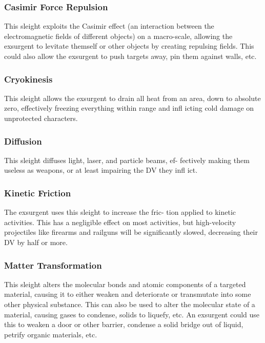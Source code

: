 \subsubsection{Casimir Force Repulsion}

This sleight exploits the Casimir effect (an interaction 
between the electromagnetic fields of different objects) 
on a macro-scale, allowing the exsurgent to levitate 
themself or other objects by creating repulsing fields. 
This could also allow the exsurgent to push targets 
away, pin them against walls, etc. 

\subsubsection{Cryokinesis}

This sleight allows the exsurgent to drain all heat from 
an area, down to absolute zero, effectively freezing 
everything within range and infl icting cold damage on 
unprotected characters.

\subsubsection{Diffusion}

This sleight diffuses light, laser, and particle beams, ef-
fectively making them useless as weapons, or at least 
impairing the DV they infl ict.

\subsubsection{Kinetic Friction}

The exsurgent uses this sleight to increase the fric-
tion applied to kinetic activities. This has a negligible 
effect on most activities, but high-velocity projectiles 
like firearms and railguns will be significantly slowed, 
decreasing their DV by half or more.

\subsubsection{Matter Transformation}

This sleight alters the molecular bonds and atomic 
components of a targeted material, causing it to either 
weaken and deteriorate or transmutate into some 
other physical substance. This can also be used to 
alter the molecular state of a material, causing gases 
to condense, solids to liquefy, etc. An exsurgent could 
use this to weaken a door or other barrier, condense a 
solid bridge out of liquid, petrify organic materials, etc.

